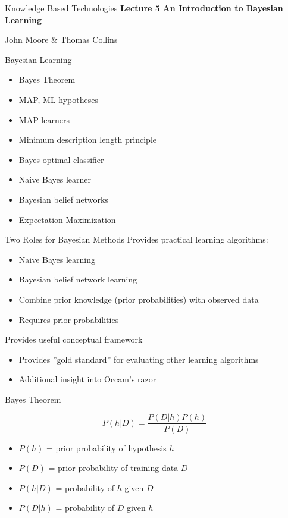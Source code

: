 \documentclass[%
pdf,
colorBG,
slideColor,
tcrico,
]{prosper}
\begin{document}
\begin{slide}{Knowledge Based Technologies}
	\textbf{Lecture 5} 
	\newline
	\textbf{An Introduction to Bayesian Learning }

	\small
	John Moore \& Thomas Collins
\end{slide}


\begin{slide}{Bayesian Learning}
	\begin{itemize}
	\item Bayes Theorem
	\item MAP, ML hypotheses
	\item MAP learners
	\item Minimum description length principle
	\item Bayes optimal classifier
	\item Naive Bayes learner
	\item Bayesian belief networks
	\item Expectation Maximization 
	\end{itemize}
\end{slide}


\begin{slide}{Two Roles for Bayesian Methods}
Provides practical learning algorithms:
\begin{itemize}
	\item Naive Bayes learning
	\item Bayesian belief network learning
	\item Combine prior knowledge (prior probabilities) with observed data
	\item Requires prior probabilities
\end{itemize}
Provides useful conceptual framework
\begin{itemize}
	\item Provides ''gold standard'' for evaluating other learning algorithms
	\item Additional insight into Occam's razor
\end{itemize}
\end{slide}


\begin{slide}{Bayes Theorem}

\[ P(h|D) = \frac{P(D|h) P(h)}{P(D)} \]

\begin{itemize}
\item $P(h)$ = prior probability of hypothesis $h$
\item $P(D)$ = prior probability of training data $D$
\item $P(h|D)$ = probability of $h$ given $D$
\item $P(D|h)$ = probability of $D$ given $h$
\end{itemize}
\end{slide}
\end{document}
